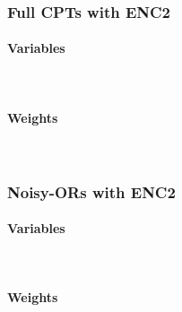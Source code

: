\documentclass{article}
\begin{document}
\newpage

\subsubsection*{Full CPTs with ENC2}
\paragraph{Variables}\mbox{}\\

\newpage
\paragraph{Weights}\mbox{}\\


\newpage

\subsubsection*{Noisy-ORs with ENC2}
\paragraph{Variables}\mbox{}\\

\newpage
\paragraph{Weights}\mbox{}\\

\end{document}
